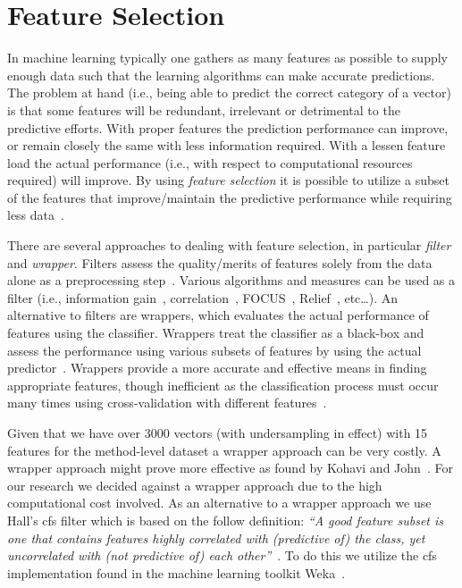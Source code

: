 \chapter{Feature Selection}
\label{app:feature_selection}
In machine learning typically one gathers as many features as possible to supply enough data such that the learning algorithms can make accurate predictions. The problem at hand (i.e., being able to predict the correct category of a vector) is that some features will be redundant, irrelevant or detrimental to the predictive efforts. With proper features the prediction performance can improve, or remain closely the same with less information required. With a lessen feature load the actual performance (i.e., with respect to computational resources required) will improve. By using \emph{feature selection} it is possible to utilize a subset of the features that improve/maintain the predictive performance while requiring less data~\cite{GE03,BL97}.

There are several approaches to dealing with feature selection, in particular \emph{filter} and \emph{wrapper}. Filters assess the quality/merits of features solely from the data alone as a preprocessing step~\cite{JKP94,BL97}. Various algorithms and measures can be used as a filter (i.e., information gain~\cite{GE03}, correlation~\cite{Hal99}, FOCUS~\cite{AD91}, Relief~\cite{KR92}, etc\ldots). An alternative to filters are wrappers, which evaluates the actual performance of features using the classifier. Wrappers treat the classifier as a black-box and assess the performance using various subsets of features by using the actual predictor~\cite{JKP94,BL97}. Wrappers provide a more accurate and effective means in finding appropriate features, though inefficient as the classification process must occur many times using cross-validation with different features~\cite{KJ97}.

Given that we have over 3000 vectors (with undersampling in effect) with 15 features for the method-level dataset a wrapper approach can be very costly. A wrapper approach might prove more effective as found by Kohavi and John~\cite{KJ97}. For our research we decided against a wrapper approach due to the high computational cost involved. As an alternative to a wrapper approach we use Hall's \gls{cfs} filter which is based on the follow definition: \emph{``A good feature subset is one that contains features highly correlated with (predictive of) the class, yet uncorrelated with (not predictive of) each other''}~\cite{Hal99}. To do this we utilize the \gls{cfs} implementation found in the machine learning toolkit Weka~\cite{HFH+09}.

